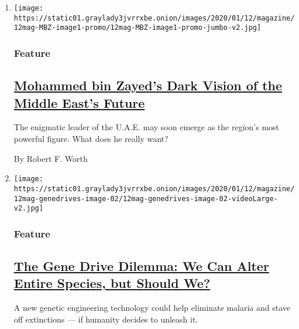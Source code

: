 \begin{enumerate}
\def\labelenumi{\arabic{enumi}.}
\item
  \texttt{[image: https://static01.graylady3jvrrxbe.onion/images/2020/01/12/magazine/12mag-MBZ-image1-promo/12mag-MBZ-image1-promo-jumbo-v2.jpg]}

  \hypertarget{feature}{%
  \subsubsection{Feature}\label{feature}}

  \hypertarget{mohammed-bin-zayeds-dark-vision-of-the-middle-easts-future}{%
  \subsection{\texorpdfstring{\href{/2020/01/09/magazine/united-arab-emirates-mohammed-bin-zayed.html}{Mohammed
  bin Zayed's Dark Vision of the Middle East's
  Future}}{Mohammed bin Zayed's Dark Vision of the Middle East's Future}}\label{mohammed-bin-zayeds-dark-vision-of-the-middle-easts-future}}

  The enigmatic leader of the U.A.E. may soon emerge as the region's
  most powerful figure. What does he really want?

  By Robert F. Worth
\item
  \texttt{[image: https://static01.graylady3jvrrxbe.onion/images/2020/01/12/magazine/12mag-genedrives-image-02/12mag-genedrives-image-02-videoLarge-v2.jpg]}

  \hypertarget{feature-1}{%
  \subsubsection{Feature}\label{feature-1}}

  \hypertarget{the-gene-drive-dilemma-we-can-alter-entire-species-but-should-we}{%
  \subsection{\texorpdfstring{\href{/2020/01/08/magazine/gene-drive-mosquitoes.html}{The
  Gene Drive Dilemma: We Can Alter Entire Species, but Should
  We?}}{The Gene Drive Dilemma: We Can Alter Entire Species, but Should We?}}\label{the-gene-drive-dilemma-we-can-alter-entire-species-but-should-we}}

  A new genetic engineering technology could help eliminate malaria and
  stave off extinctions --- if humanity decides to unleash it.


\end{enumerate}
